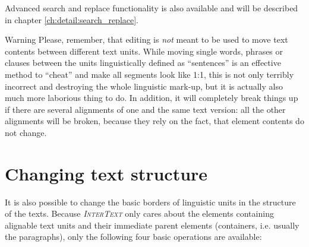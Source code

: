 \documentclass[a4paper,10pt,oneside]{book}
\newcommand{\IT}{\textit{\textsc{InterText}}\xspace}
\begin{document}
Advanced search and replace functionality is also available and will be described in chapter \ref{ch:detail:search_replace}.

\medskip
\begin{bclogo}[couleur = blue!30, arrondi = 0.1, logo = \bcattention,
ombre = true , epOmbre = 0.125, couleurOmbre = black!30, blur, epBord = 0.3, marge = 5]{Warning}\small
Please, remember, that editing is \emph{not} meant to be used to move text contents between different text units. While moving single words, phrases or clauses between the units linguistically defined as ``sentences'' is an effective method to ``cheat'' and make all segments look like 1:1, this is not only terribly incorrect and destroying the whole linguistic mark-up, but it is actually also much more laborious thing to do. In addition, it will completely break things up if there are several alignments of one and the same text version: all the other alignments will be broken, because they rely on the fact, that element contents do not change.
\end{bclogo}

\section{Changing text structure}\label{ch:howto:edit_struc}

It is also possible to change the basic borders of linguistic units in the structure of the texts. Because \IT only cares about the elements containing alignable text units and their immediate parent elements (containers, i.e. usually the paragraphs), only the following four basic operations are available:
\end{document}
